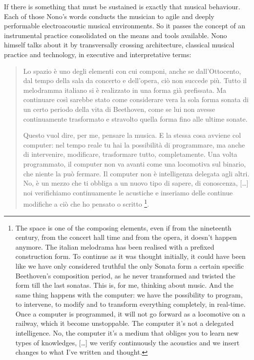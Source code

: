 \documentclass[twoside,a4paper]{article}
\begin{document}
If there is something that must be sustained is exactly that musical behaviour. Each of those Nono's words conducts the musician to agile and deeply performable electroacoustic musical environments. So it  passes the concept of an instrumental practice consolidated on the means and tools available. Nono himself talks about it by transversally crossing architecture, classical musical practice and technology, in executive and interpretative terms:

\begin{quote}
Lo spazio è uno degli elementi con cui componi, anche se dall'Ottocento, dal tempo della sala da concerto e dell'opera, ciò non succede più. 
Tutto il melodramma italiano si è realizzato in una forma già prefissata. Ma continuare così sarebbe stato come considerare vera la sola forma sonata di un certo periodo della vita di Beethoven, come se lui non avesse continuamente trasformato e stravolto quella forma fino alle ultime sonate. 

Questo vuol dire, per me, pensare la musica. E la stessa cosa avviene col computer: nel tempo reale tu hai la possibilità di programmare, ma anche di intervenire, modificare, trasformare tutto, completamente. Una volta programmato, il computer non va avanti come una locomotiva sul binario, che niente la può fermare. Il computer non è intelligenza delegata agli altri. No, è un mezzo che ti obbliga a un nuovo tipo di sapere, di conoscenza, [\ldots] %
noi verifichiamo continuamente le acustiche e inseriamo delle continue modifiche a ciò che ho pensato o scritto \cite{nono84}\footnote{The space is one of the composing elements, even if from the nineteenth century, from the concert hall time and from the opera, it doesn’t happen anymore. The italian melodrama has been realised with a prefixed construction form. To continue as it was thought initially, it could have been like we have only considered truthful the only Sonata form a certain specific Beethoven's composition period, as he never transformed and twisted the form till the last sonatas. This is, for me, thinking about music. And the same thing happens with the computer: we have the possibility to program, to intervene, to modify and to transform everything completely, in real-time. Once a computer is programmed, it will not go forward as a locomotive on a railway, which it become unstoppable. The computer it’s not a delegated intelligence. No, the computer it’s a medium that obliges you to learn new types of knowledges, [\ldots] we verify continuously the acoustics and we insert changes to what I’ve written and thought.}. 
\end{quote}
\end{document}
